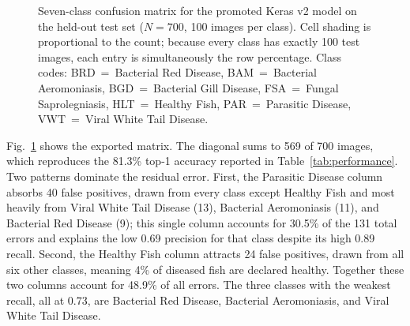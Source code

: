 \documentclass[conference]{IEEEtran}
\begin{document}
\begin{figure}[!t]
\centering
{}
\caption{Seven-class confusion matrix for the promoted Keras v2 model on the held-out test set ($N=700$, 100 images per class). Cell shading is proportional to the count; because every class has exactly 100 test images, each entry is simultaneously the row percentage. Class codes: BRD~=~Bacterial Red Disease, BAM~=~Bacterial Aeromoniasis, BGD~=~Bacterial Gill Disease, FSA~=~Fungal Saprolegniasis, HLT~=~Healthy Fish, PAR~=~Parasitic Disease, VWT~=~Viral White Tail Disease.}
\label{fig:confusion}
\end{figure}

Fig.~\ref{fig:confusion} shows the exported matrix. The diagonal sums to 569 of 700 images, which reproduces the 81.3\% top-1 accuracy reported in Table~\ref{tab:performance}. Two patterns dominate the residual error. First, the Parasitic Disease column absorbs 40 false positives, drawn from every class except Healthy Fish and most heavily from Viral White Tail Disease (13), Bacterial Aeromoniasis (11), and Bacterial Red Disease (9); this single column accounts for 30.5\% of the 131 total errors and explains the low 0.69 precision for that class despite its high 0.89 recall. Second, the Healthy Fish column attracts 24 false positives, drawn from all six other classes, meaning 4\% of diseased fish are declared healthy. Together these two columns account for 48.9\% of all errors. The three classes with the weakest recall, all at 0.73, are Bacterial Red Disease, Bacterial Aeromoniasis, and Viral White Tail Disease.
\end{document}
